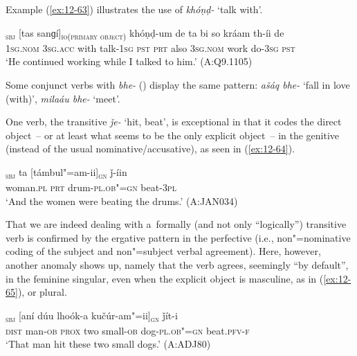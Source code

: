 Example (\ref{ex:12-63}) illustrates the use of \textit{khóṇḍ-} `talk with'.

\begin{exe}
\ex
\label{ex:12-63}
\gll [ma]\textsubscript{\textsc{sbj}} [tas sanɡí]\textsubscript{\textsc{io(primary object)}} khóṇḍ-um de ta bi so kráam th-íi de \\
\textsc{1sg.nom} \textsc{3sg.acc} with talk-\textsc{1sg} \textsc{pst}  \textsc{prt} also \textsc{3sg.nom} work do-\textsc{3sg} \textsc{pst} \\
\glt `He continued working while I talked to him.' (A:Q9.1105)
\end{exe}

Some conjunct verbs with \textit{bhe-} () display the same pattern: \textit{ašáq bhe-} `fall in love (with)', \textit{milaáu bhe-} `meet'.


 One verb, the transitive \textit{ǰe-} `hit, beat', is exceptional in that it codes the direct object~-- or at least what seems to be the only explicit object~-- in the genitive (instead of the usual nominative/accusative), as seen in (\ref{ex:12-64}).

\begin{exe}
\ex
\label{ex:12-64}
\gll [kuṛíina]\textsubscript{\textsc{sbj}} ta [támbul"=am-ii]\textsubscript{\textsc{gn}} ǰ-íin  \\
woman.\textsc{pl} \textsc{prt} drum-\textsc{pl.ob"=gn} beat-\textsc{3pl}  \\
\glt `And the women were beating the drums.' (A:JAN034)
\end{exe}

That we are indeed dealing with a~formally (and not only ``logically'') transitive verb is confirmed by the ergative pattern in the perfective (i.e., non"=nominative coding of the subject and non"=subject verbal agreement). Here, however, another anomaly shows up, namely that the verb agrees, seemingly ``by default'', in the feminine singular, even when the explicit object is masculine, as in (\ref{ex:12-65}), or plural.

\begin{exe}
\ex
\label{ex:12-65}
\textsubscript{\textsc{sbj}} [aní dúu lhoók-a kučúr-am"=ii]\textsubscript{\textsc{gn}} ǰít-i \\
\textsc{dist} man-\textsc{ob} \textsc{prox} two small-\textsc{ob} dog-\textsc{pl.ob"=gn} beat.\textsc{pfv-f} \\
\glt `That man hit these two small dogs.' (A:ADJ80)
\end{exe}

